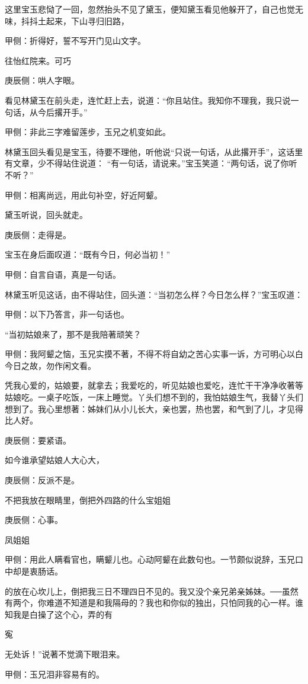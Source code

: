 \begin{parag}
    这里宝玉悲恸了一回，忽然抬头不见了黛玉，便知黛玉看见他躲开了，自己也觉无味，抖抖土起来，下山寻归旧路，\begin{note}甲侧：折得好，誓不写开门见山文字。\end{note}往怡红院来。可巧\begin{note}庚辰侧：哄人字眼。\end{note}看见林黛玉在前头走，连忙赶上去，说道：“你且站住。我知你不理我，我只说一句话，从今后撂开手。”\begin{note}甲侧：非此三字难留莲步，玉兄之机变如此。\end{note}林黛玉回头看见是宝玉，待要不理他，听他说“只说一句话，从此撂开手”，这话里有文章，少不得站住说道： “有一句话，请说来。”宝玉笑道：“两句话，说了你听不听？”\begin{note}甲侧：相离尚远，用此句补空，好近阿颦。\end{note}黛玉听说，回头就走。\begin{note}庚辰侧：走得是。\end{note}宝玉在身后面叹道：“既有今日，何必当初！”\begin{note}甲侧：自言自语，真是一句话。\end{note}林黛玉听见这话，由不得站住，回头道：“当初怎么样？今日怎么样？”宝玉叹道：\begin{note}甲侧：以下乃答言，非一句话也。\end{note}“当初姑娘来了，那不是我陪著顽笑？\begin{note}甲侧：我阿颦之恼，玉兄实摸不著，不得不将自幼之苦心实事一诉，方可明心以白今日之故，勿作闲文看。\end{note}凭我心爱的，姑娘要，就拿去；我爱吃的，听见姑娘也爱吃，连忙干干净净收著等姑娘吃。一桌子吃饭，一床上睡觉。丫头们想不到的，我怕姑娘生气，我替丫头们想到了。我心里想著：姊妹们从小儿长大，亲也罢，热也罢，和气到了儿，才见得比人好。\begin{note}庚辰侧：要紧语。\end{note}如今谁承望姑娘人大心大，\begin{note}庚辰侧：反派不是。\end{note}不把我放在眼睛里，倒把外四路的什么宝姐姐\begin{note}庚辰侧：心事。\end{note}凤姐姐\begin{note}甲侧：用此人瞒看官也，瞒颦儿也。心动阿颦在此数句也。一节颇似说辞，玉兄口中却是衷肠话。\end{note}的放在心坎儿上，倒把我三日不理四日不见的。我又没个亲兄弟亲姊妹。──虽然有两个，你难道不知道是和我隔母的？我也和你似的独出，只怕同我的心一样。谁知我是白操了这个心，弄的有\begin{note}寃\end{note}无处诉！”说著不觉滴下眼泪来。\begin{note}甲侧：玉兄泪非容易有的。\end{note}
\end{parag}


